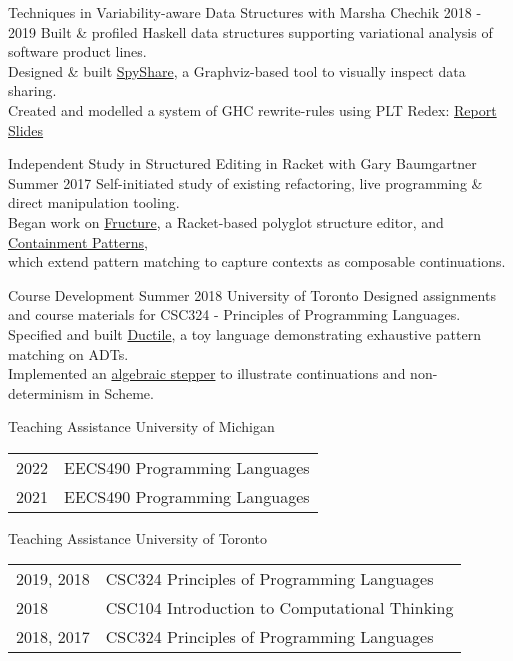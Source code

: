 \documentclass[10pt,a4paper]{article}
\begin{document}
  \headedsubsection
    {Techniques in Variability-aware Data Structures with Marsha Chechik}
    {2018 - 2019}
    {Built \& profiled Haskell data structures supporting variational analysis of software product lines. \\
    Designed \& built \href{https://github.com/disconcision/spyshare}{SpyShare}, a Graphviz-based tool to visually inspect data sharing. \\
    Created and modelled a system of GHC rewrite-rules using PLT Redex:    \href{https://github.com/disconcision/vardatalab/blob/master/CSC495_TECHNIQUES_IN_VARIABILITY_AWARE_DATA_STRUCTURES.pdf}{Report} \sbull \href{https://github.com/disconcision/vardatalab/blob/master/CSC495_variational_data_structures_slides.pdf}{Slides}}
    
  \headedsubsection
    {Independent Study in Structured Editing in Racket with Gary Baumgartner}
    {Summer 2017}
    {Self-initiated study of existing refactoring, live programming \& direct manipulation tooling.\\
    Began work on \href{https://github.com/disconcision/fructure}{Fructure}, a Racket-based polyglot structure editor, and \href{https://github.com/disconcision/containment-patterns}{Containment Patterns}, \\ which extend pattern matching to capture contexts as composable continuations.}


  \headedsubsection
    {Course Development}
    {Summer 2018 \sbull University of Toronto}
    {Designed assignments and course materials for CSC324 - Principles of Programming Languages. \\
    Specified and built \href{https://github.com/disconcision/ductile}{Ductile}, a toy language demonstrating exhaustive pattern matching on ADTs. \\
    Implemented an \href{https://github.com/disconcision/racketlab/blob/master/choice-stepper.rkt}{algebraic stepper} to illustrate continuations and non-determinism in Scheme.}
  
  \headedsubsection
    {Teaching Assistance}
    {University of Michigan}
    {\begin{tabular}{p{2.3cm} l}
    2022 & EECS490 Programming Languages \\
    2021 & EECS490 Programming Languages
    \end{tabular}}
    
  \headedsubsection
    {Teaching Assistance}
    {University of Toronto}
    {\begin{tabular}{p{2.3cm} l}
    2019, 2018 & CSC324 Principles of Programming Languages\\
    2018 & CSC104 Introduction to Computational Thinking \\
    2018, 2017 & CSC324 Principles of Programming Languages \\
    \end{tabular}}
  
\end{document}
